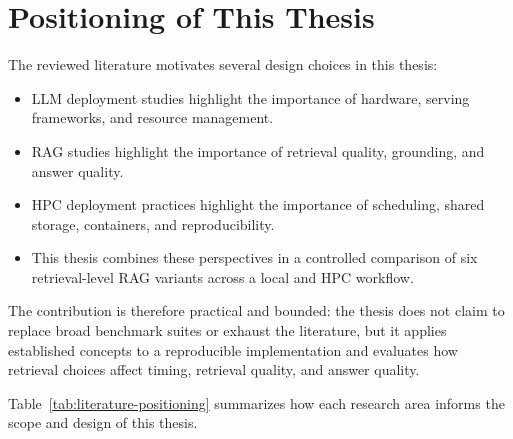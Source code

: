 \section{Positioning of This Thesis}

The reviewed literature motivates several design choices in this thesis:

\begin{itemize}
    \item \ac{LLM} deployment studies highlight the importance of hardware, serving frameworks, and resource management.
    \item \ac{RAG} studies highlight the importance of retrieval quality, grounding, and answer quality.
    \item \ac{HPC} deployment practices highlight the importance of scheduling, shared storage, containers, and reproducibility.
    \item This thesis combines these perspectives in a controlled comparison of six retrieval-level \ac{RAG} variants across a local and \ac{HPC} workflow.
\end{itemize}

The contribution is therefore practical and bounded: the thesis does not claim to replace broad benchmark suites or exhaust the literature, but it applies established concepts to a reproducible implementation and evaluates how retrieval choices affect timing, retrieval quality, and answer quality.

Table~\ref{tab:literature-positioning} summarizes how each research area informs the scope and design of this thesis.

